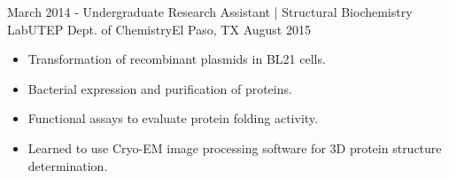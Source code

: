 \begin{experiences}
  \emptySeparator
  
    \experience
    {March 2014 -}     {Undergraduate Research Assistant | Structural Biochemistry Lab}{UTEP Dept. of Chemistry}{El Paso, TX}
    {August 2015}    {
        \begin{itemize}
        \item Transformation of recombinant plasmids in BL21 cells.
        \item Bacterial expression and purification of proteins.
        \item Functional assays to evaluate protein folding activity.
        \item Learned to use Cryo-EM image processing software for 3D protein structure determination.
        \end{itemize}
    }
    

\end{experiences}
